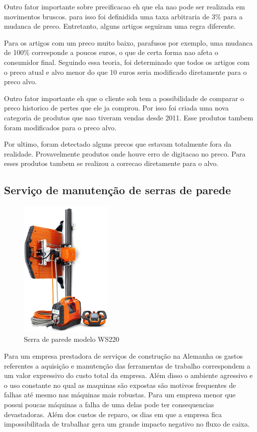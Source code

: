 \documentclass[12pt]{article}
\begin{document}
	Outro fator importante sobre precificacao eh que ela nao pode ser realizada em movimentos bruscos. para isso foi definidida uma taxa arbitraria de 3\% para a mudanca de preco. Entretanto, alguns artigos seguiram uma regra diferente.

	Para os artigos com um preco muito baixo, parafusos por exemplo, uma mudanca de 100\% corresponde a poucos euros, o que de certa forma nao afeta o consumidor final. Seguindo essa teoria, foi determinado que todos os artigos com o preco atual e alvo menor do que 10 euros seria modificado diretamente para o preco alvo.

Outro fator importante eh que o cliente soh tem a possibilidade de comparar o preco historico de pertes que ele ja comprou. Por isso foi criada uma nova categoria de produtos que nao tiveram vendas desde 2011. Esse produtos tambem foram modificados para o preco alvo.

Por ultimo, foram detectado alguns precos que estavam totalmente fora da realidade. Provavelmente produtos onde houve erro de digitacao no preco. Para esses produtos tambem se realizou a correcao diretamente para o alvo.

\subsection{Serviço de manutenção de serras de parede}

\begin{figure}[h!]
	\centering
	\includegraphics[width=0.4\textwidth]{img/ws220_produto.png}
	\caption{Serra de parede modelo WS220}
	\label{fig:ws220_produto}
\end{figure}

	Para um empresa prestadora de serviços de construção na Alemanha os gastos referentes a aquisição e manutenção das ferramentas de trabalho correspondem a um valor expressivo do custo total da empresa. Além disso o ambiente agressivo e o uso constante no qual as maquinas são expostas são motivos frequentes de falhas até mesmo nas máquinas mais robustas. Para um empresa menor que possui poucas máquinas a falha de uma delas pode ter consequencias devastadoras. Além dos custos de reparo, os dias em que a empresa fica impossibilitada de trabalhar gera um grande impacto negativo no fluxo de caixa.
\end{document}
